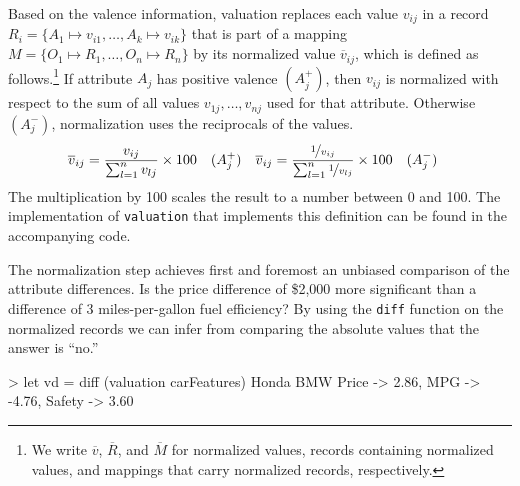 \documentclass{jfp}
\newcommand{\norm}[1]{\ensuremath{\overline{#1}}}
\newcommand{\nv}{\norm{v}}
\newcommand{\seq}[3]{\ensuremath{\overline{#3}^{#1:1..#2}}}
\newcommand{\prog}[1]{\texttt{#1}}
\begin{document}
\noindent
%
Based on the valence information, valuation replaces each value $v_{ij}$ in a record 
%
$R_i = \{A_1 \mapsto v_{i1}, \ldots, A_k \mapsto v_{ik}\}$ 
%
that is part of a mapping 
%
$M = \{O_1 \mapsto R_1, \ldots, O_n \mapsto R_n\}$ 
%
by its normalized value $\nv_{ij}$, which is defined as follows.\footnote{We write \norm{v}, \norm{R}, and \norm{M} for normalized values, records containing normalized values, and mappings that carry normalized records, respectively.}
%
%
%
%
%
%
If attribute $A_j$ has positive valence $(A_j^+)$, then $v_{ij}$ is normalized with respect to the sum of all values $v_{1j}, \ldots, v_{nj}$ used for that attribute. Otherwise $(A_j^-)$, normalization uses the reciprocals of the values.
%
\begin{align*}
&\norm{v}_{ij} = \frac{v_{ij}}{\sum_{l=1}^{n} v_{lj}} \times 100
\quad (A_j^+)
&\norm{v}_{ij} &= \frac{\nicefrac{1}{v_{ij}}}{\sum_{l=1}^{n} \nicefrac{1} {v_{lj}}} \times 100
\quad (A_j^-)
\end{align*}
%
The multiplication by 100 scales the result to a number between 0 and 100.
%
The implementation of \prog{valuation} that implements this definition can be found in the accompanying code.

The normalization step achieves first and foremost an unbiased comparison of the attribute differences. Is the price difference of \$2,000 more significant than a difference of 3 miles-per-gallon fuel efficiency?
%
By using the \prog{diff} function on the normalized records we can infer from comparing the absolute values that the answer is ``no.'' 

%
\begin{haskellcode}
> let vd = diff (valuation carFeatures) Honda BMW
{Price -> 2.86, MPG -> -4.76, Safety -> 3.60}
\end{haskellcode}
\end{document}
